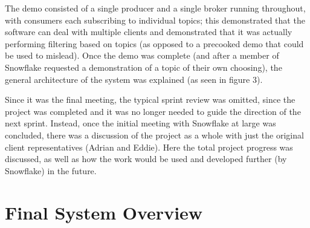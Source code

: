 \documentclass[a4paper, 12pt, twoside]{article}
\begin{document}
The demo consisted of a single producer and a single broker running throughout, with consumers each subscribing to individual topics; this demonstrated that the software can deal with multiple clients and demonstrated that it was actually performing filtering based on topics (as opposed to a precooked demo that could be used to mislead). Once the demo was complete (and after a member of Snowflake requested a demonstration of a topic of their own choosing), the general architecture of the system was explained (as seen in figure 3).

Since it was the final meeting, the typical sprint review was omitted, since the project was completed and it was no longer needed to guide the direction of the next sprint.  Instead, once the initial meeting with Snowflake at large was concluded, there was a discussion of the project as a whole with just the original client representatives (Adrian and Eddie). Here the total project progress was discussed, as well as how the work would be used and developed further (by Snowflake) in the future. 



\section{Final System Overview}
\label{sec:final_system}
\end{document}
